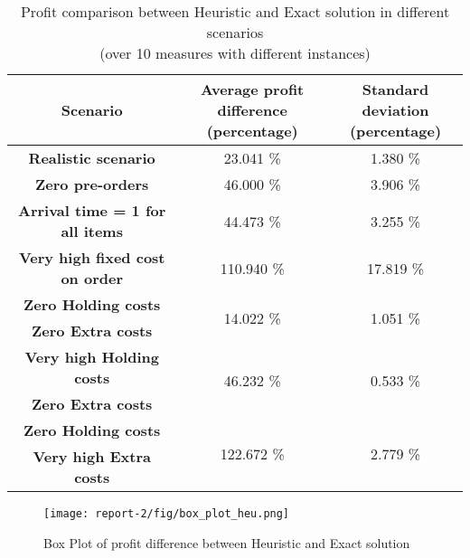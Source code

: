 \documentclass{article}
\begin{document}
\begin{table}[!htb]
\vspace{15pt}
    \centering
    \captionsetup{justification=centering}
    \begin{tabular}{|c|c|c|}
    \hline
        \textbf{Scenario} & \makecell{\textbf{Average profit} \\ \textbf{difference (percentage)}} & \makecell{\textbf{Standard deviation} \\ \textbf{(percentage)}} \\ \hline 
        \textbf{Realistic scenario} & 23.041 \% & 1.380 \% \\ \hline
        \textbf{Zero pre-orders} & 46.000 \% & 3.906 \% \\ \hline
        \textbf{Arrival time = 1 for all items} & 44.473 \% & 3.255 \% \\ \hline
        \textbf{Very high fixed cost on order} & 110.940 \% & 17.819 \% \\ \hline
        \textbf{Zero Holding costs} & \multirow{2}{*}{14.022 \%} & \multirow{2}{*}{1.051 \%} \\ 
        \textbf{Zero Extra costs} & & \\\hline
        \textbf{Very high Holding costs} & \multirow{2}{*}{46.232 \%} & \multirow{2}{*}{0.533 \%} \\ 
        \textbf{Zero Extra costs} & & \\\hline
        \textbf{Zero Holding costs} & \multirow{2}{*}{122.672 \%} & \multirow{2}{*}{2.779 \%} \\ 
        \textbf{Very high Extra costs} & & \\\hline
    \end{tabular}
    \caption{Profit comparison between Heuristic and Exact solution in different scenarios \\(over 10 measures with different instances)}
    \label{tab:Heur_profit}
    \vspace{20pt}
\end{table}
\begin{figure}[!htb]
    \centering
    \texttt{[image: report-2/fig/box\_plot\_heu.png]}
    \caption{Box Plot of profit difference between Heuristic and Exact solution}
    \label{fig:box_plot_heu}
    \vspace{15pt}
\end{figure}
\end{document}
